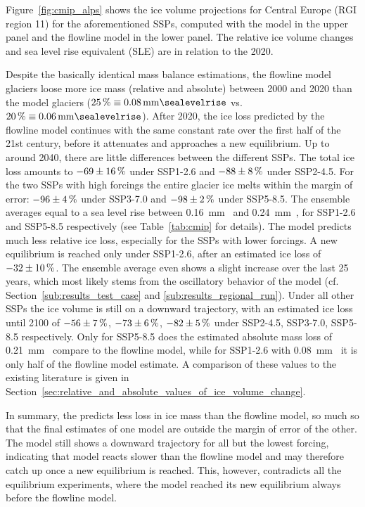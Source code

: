       Figure~\ref{fig:cmip_alps} shows the ice volume projections for Central Europe (RGI region 11) for the aforementioned SSPs, computed with the \vas{} model in the upper panel and the flowline model in the lower panel. The relative ice volume changes and sea level rise equivalent (SLE) are in relation to the 2020.

      Despite the basically identical mass balance estimations, the flowline model glaciers loose more ice mass (relative and absolute) between 2000 and 2020 than the \vas{} model glaciers ($\SI{25}{\percent} \equiv \SI{0.08}{\milli\meter\sealevelrise}$ vs. $\SI{20}{\percent} \equiv \SI{0.06}{\milli\meter\sealevelrise}$). After 2020, the ice loss predicted by the flowline model continues with the same constant rate over the first half of the 21st century, before it attenuates and approaches a new equilibrium. Up to around 2040, there are little differences between the different SSPs. The total ice loss amounts to $-69\SI{\pm16}{\percent} $ under SSP1-2.6 and $-88\SI{\pm8}{\percent}$  under SSP2-4.5. For the two SSPs with high forcings the entire glacier ice melts within the margin of error: $-96\SI{\pm4}{\percent}$ under SSP3-7.0 and $-98\SI{\pm2}{\percent}$ under SSP5-8.5. The ensemble averages equal to a sea level rise between \SI{0.16}{\milli\meter\sealevelrise} and \SI{0.24}{\milli\meter\sealevelrise}, for SSP1-2.6 and SSP5-8.5 respectively (see Table~\ref{tab:cmip} for details). The \vas{} model predicts much less relative ice loss, especially for the SSPs with lower forcings. A new equilibrium is reached only under SSP1-2.6, after an estimated ice loss of $-32\SI{\pm10}{\percent}$. The ensemble average even shows a slight increase over the last 25 years, which most likely stems from the oscillatory behavior of the \vas{} model (cf. Section~\ref{sub:results_test_case} and \ref{sub:results_regional_run}). Under all other SSPs the ice volume is still on a downward trajectory, with an estimated ice loss until 2100 of $-56\SI{\pm7}{\percent}$, $-73\SI{\pm6}{\percent}$, $-82\SI{\pm5}{\percent}$ under SSP2-4.5, SSP3-7.0, SSP5-8.5 respectively. Only for SSP5-8.5 does the estimated absolute mass loss of \SI{0.21}{\milli\meter\sealevelrise} compare to the flowline model, while for SSP1-2.6 with \SI{0.08}{\milli\meter\sealevelrise} it is only half of the flowline model estimate. A comparison of these values to the existing literature is given in Section~\ref{sec:relative_and_absolute_values_of_ice_volume_change}.

      In summary, the \vas{} predicts less loss in ice mass than the flowline model, so much so that the final estimates of one model are outside the margin of error of the other. The \vas{} model still shows a downward trajectory for all but the lowest forcing, indicating that \vas{} model reacts slower than the flowline model and may therefore catch up once a new equilibrium is reached. This, however, contradicts all the equilibrium experiments, where the \vas{} model reached its new equilibrium always before the flowline model.


